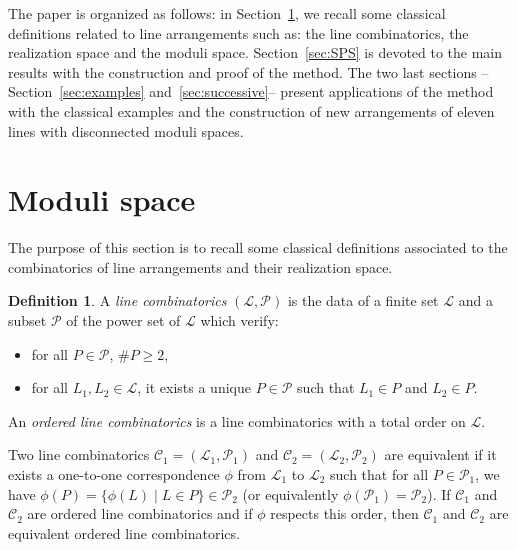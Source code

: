 \documentclass[11pt, a4paper]{amsart}
\theoremstyle{definition}
\newtheorem{definition}[theorem]{Definition}
\theoremstyle{remark}
\newcommand{\C}{\mathcal{C}}
\renewcommand{\P}{\mathcal{P}}
\renewcommand{\L}{\mathcal{L}}
\begin{document}
The paper is organized as follows: in Section~\ref{sec:moduli}, we recall some classical definitions related to line arrangements such as: the line combinatorics, the realization space and the moduli space. Section~\ref{sec:SPS} is devoted to the main results with the construction and proof of the method. The two last sections --Section~\ref{sec:examples} and~\ref{sec:successive}-- present applications of the method with the classical examples and the construction of new arrangements of eleven lines with disconnected moduli spaces.
	
	
\section{Moduli space}\label{sec:moduli}

The purpose of this section is to recall some classical definitions associated to the combinatorics of line arrangements and their realization space. 

\begin{definition}	\label{def:combinatorics}
	A \emph{line combinatorics} $(\L,\P)$ is the data of a finite set $\L$ and a subset $\P$ of the power set of $\L$ which verify:
	\begin{itemize}
		\item for all $P\in\P$, $\# P \geq 2$,
		\item for all $L_1, L_2 \in \L$, it exists a unique $P\in\P$ such that $L_1\in P$ and $L_2\in P$.
	\end{itemize}
	An \emph{ordered line combinatorics} is a line combinatorics with a total order on $\L$.
\end{definition}

Two line combinatorics $\C_1=(\L_1,\P_1)$ and $\C_2=(\L_2,\P_2)$ are equivalent if it exists a one-to-one correspondence $\phi$ from $\L_1$ to $\L_2$ such that for all $P\in\P_1$, we have $\phi(P)=\{ \phi(L) \mid L\in P \} \in \P_2$ (or equivalently $\phi(\P_1)=\P_2$). If $\C_1$ and $\C_2$ are ordered line combinatorics and if $\phi$ respects this order, then $\C_1$ and $\C_2$ are equivalent ordered line combinatorics. 
\end{document}

